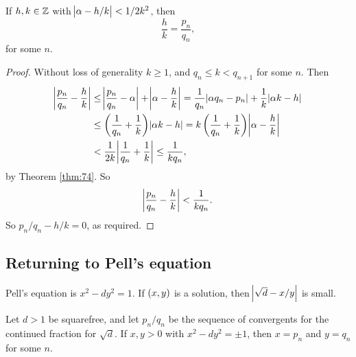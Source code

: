 \begin{corollary}
\label{cor:75}
If $ h, k \in \mathbb{Z} $ with $ \abs{\alpha - h / k} < 1 / 2k^2 $, then
$$ \dfrac{h}{k} = \dfrac{p_n}{q_n}, $$
for some $ n $.
\end{corollary}

\begin{proof}
Without loss of generality $ k \ge 1 $, and $ q_n \le k < q_{n + 1} $ for some $ n $. Then
\begin{align*}
\abs{\dfrac{p_n}{q_n} - \dfrac{h}{k}}
& \le \abs{\dfrac{p_n}{q_n} - \alpha} + \abs{\alpha - \dfrac{h}{k}}
= \dfrac{1}{q_n}\abs{\alpha q_n - p_n} + \dfrac{1}{k}\abs{\alpha k - h} \\
& \le \br{\dfrac{1}{q_n} + \dfrac{1}{k}}\abs{\alpha k - h}
= k\br{\dfrac{1}{q_n} + \dfrac{1}{k}}\abs{\alpha - \dfrac{h}{k}} \\
& < \dfrac{1}{2k}\abs{\dfrac{1}{q_n} + \dfrac{1}{k}}
\le \dfrac{1}{kq_n},
\end{align*}
by Theorem \ref{thm:74}. So
$$ \abs{\dfrac{p_n}{q_n} - \dfrac{h}{k}} < \dfrac{1}{kq_n}. $$
So $ p_n / q_n - h / k = 0 $, as required.
\end{proof}

\pagebreak

\subsection{Returning to Pell's equation}


Pell's equation is $ x^2 - dy^2 = 1 $. If $ \br{x, y} $ is a solution, then $ \abs{\sqrt{d} - x / y} $ is small.

\begin{proposition}
Let $ d > 1 $ be squarefree, and let $ p_n / q_n $ be the sequence of convergents for the continued fraction for $ \sqrt{d} $. If $ x, y > 0 $ with $ x^2 - dy^2 = \pm 1 $, then $ x = p_n $ and $ y = q_n $ for some $ n $.
\end{proposition}

